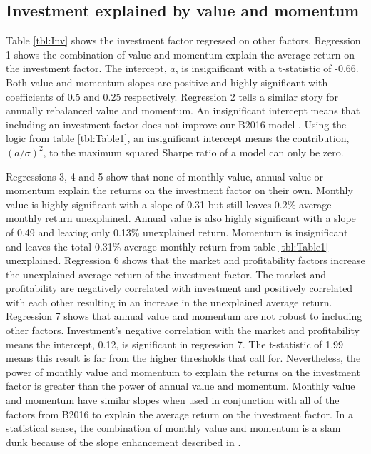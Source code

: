 
\subsection{Investment explained by value and momentum}


Table \ref{tbl:Inv} shows the investment factor regressed on other factors. Regression 1
shows the combination of value and momentum explain the average return on the investment
factor. The intercept, $a$, is insignificant with a t-statistic of -0.66. Both value and
momentum slopes are positive and highly significant with coefficients of 0.5 and 0.25
respectively. Regression 2 tells a similar story for annually rebalanced value and
momentum. An insignificant intercept means that including an investment factor does not
improve our B2016 model \parencite{fama1998determining, barillas2016alpha,
fama2016choosing}. Using the logic from table \ref{tbl:Table1}, an insignificant intercept
means the contribution, $(a/\sigma)^2$, to the maximum squared Sharpe ratio of a model can
only be zero.

Regressions 3, 4 and 5 show that none of monthly value, annual value or momentum explain
the returns on the investment factor on their own. Monthly value is highly significant
with a slope of 0.31 but still leaves 0.2\% average monthly return unexplained. Annual
value is also highly significant with a slope of 0.49 and leaving only 0.13\% unexplained
return. Momentum is insignificant and leaves the total 0.31\% average monthly return from
table \ref{tbl:Table1} unexplained. Regression 6 shows that the market and profitability
factors increase the unexplained average return of the investment factor. The market and
profitability are negatively correlated with investment and positively correlated with
each other resulting in an increase in the unexplained average return. Regression 7 shows
that annual value and momentum are not robust to including other factors. Investment's
negative correlation with the market and profitability means the intercept, 0.12, is
significant in regression 7. The t-statistic of 1.99 means this result is far from the
higher thresholds that \textcite{harvey2016and} call for. Nevertheless, the power of
monthly value and momentum to explain the returns on the investment factor is greater than
the power of annual value and momentum. Monthly value and momentum have similar slopes
when used in conjunction with all of the factors from B2016 to explain the average return
on the investment factor. In a statistical sense, the combination of monthly value and
momentum is a slam dunk because of the slope enhancement described in
\textcite{fama2015incremental}.

